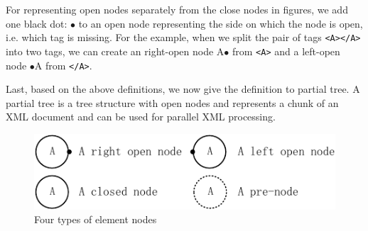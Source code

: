 

For representing open nodes separately from the close nodes in figures, we add
one black dot: $\bullet$ to an open node representing the side on which the node
is open, i.e. which tag is missing. For the example, when we split the pair of
tags \texttt{<A></A>} into two tags, we can create an right-open node A$\bullet$
from \texttt{<A>} and a left-open node $\bullet$A from \texttt{</A>}.


Last, based on the above definitions, we now give the definition to partial
tree. A partial tree is a tree structure with open nodes and represents a chunk
of an XML document and can be used for parallel XML processing.


\begin{figure}[t]
\centering\includegraphics{partialtree/figures/fromWord-2.pdf}
\caption{Four types of element nodes}
\label{fig:nodetypes}
\end{figure}
